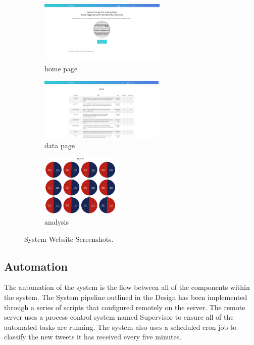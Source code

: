 \documentclass[11pt]{report}
\begin{document}
\begin{figure}[H]
        \begin{subfigure}[b]{0.30\textwidth}
                \includegraphics[width=\linewidth, height = 3cm]{images/home.png}
                \caption{home page}
                \label{fig:gull}
        \end{subfigure}%
        \hfill
        \begin{subfigure}[b]{0.30\textwidth}
                \includegraphics[width=\linewidth, height = 3cm]{images/data.png}
                \caption{data page}
                \label{fig:gull2}
        \end{subfigure}%
        \hfill
        \begin{subfigure}[b]{0.30\textwidth}
                \includegraphics[width=\linewidth, height = 3cm]{images/analysis.png}
                \caption{analysis}
                \label{fig:tiger}
        \end{subfigure}%

        \caption{System Website Screenshots.}\label{fig:screenshots}
\end{figure}

\subsection*{Automation}
The automation of the system is the flow between all of the components within the system. The System pipeline outlined in the Design has been implemented through a series of scripts  that configured remotely on the server. The remote server uses a process control system named Supervisor to ensure all of the automated tasks are running. The system also uses a scheduled cron job to classify the new tweets it has received every five minutes.
\\
\end{document}
